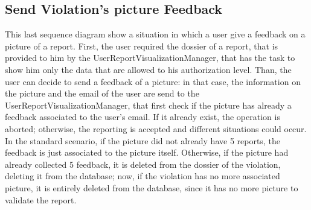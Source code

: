 \documentclass[../RASD.tex]{subfiles}
\begin{document}
    \subsection{Send Violation's picture Feedback}\label{subsec:send-violation's-picture-feedback}
    \begin{figure}[H]
    \end{figure}
    This last sequence diagram show a situation in which a user give a feedback on a picture of a report.
    First, the user required the dossier of a report, that is provided to him by the UserReportVisualizationManager,
    that has the task to show him only the data that are allowed to his authorization level.
    Than, the user can decide to send a feedback of a picture: in that case, the information on the picture and the email of the user
    are send to the UserReportVisualizationManager, that first check if the picture has already a feedback associated to the user's email.
    If it already exist, the operation is aborted;
    otherwise, the reporting is accepted and different situations could occur.
    In the standard scenario, if the picture did not already have 5 reports, the feedback is just associated to the picture itself.
    Otherwise, if the picture had already collected 5 feedback, it is deleted from the dossier of the violation, deleting it from the database;
    now, if the violation has no more associated picture, it is entirely deleted from the database, since it has no more picture to validate the report.
    \newpage
\end{document}
